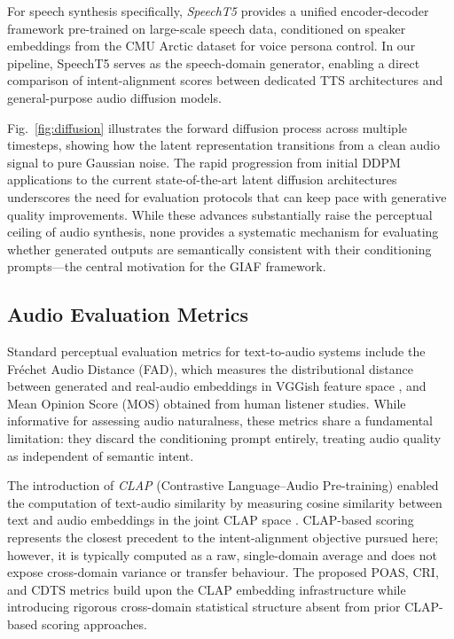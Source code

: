 \documentclass[journal]{IEEEtran}
\begin{document}
For speech synthesis specifically, \textit{SpeechT5}
\cite{ao2021speecht5} provides a unified encoder-decoder framework
pre-trained on large-scale speech data, conditioned on speaker
embeddings from the CMU Arctic dataset for voice persona control.
In our pipeline, SpeechT5 serves as the speech-domain generator,
enabling a direct comparison of intent-alignment scores between
dedicated TTS architectures and general-purpose audio diffusion models.



Fig.~\ref{fig:diffusion} illustrates the forward diffusion process
across multiple timesteps, showing how the latent representation
transitions from a clean audio signal to pure Gaussian noise. The
rapid progression from initial DDPM applications to the current state-of-the-art
latent diffusion architectures underscores the need for evaluation
protocols that can keep pace with generative quality improvements.
While these advances substantially raise the perceptual ceiling of
audio synthesis, none provides a systematic mechanism for evaluating
whether generated outputs are semantically consistent with their
conditioning prompts---the central motivation for the GIAF framework.

\subsection{Audio Evaluation Metrics}

Standard perceptual evaluation metrics for text-to-audio systems
include the Fr{\'e}chet Audio Distance (FAD), which measures the
distributional distance between generated and real-audio embeddings
in VGGish feature space \cite{kilgour2018fad}, and Mean Opinion Score
(MOS) obtained from human listener studies. While informative for
assessing audio naturalness, these metrics share a fundamental
limitation: they discard the conditioning prompt entirely, treating
audio quality as independent of semantic intent.

The introduction of \textit{CLAP} (Contrastive Language--Audio
Pre-training) \cite{elizalde2023clap} enabled the computation of
text-audio similarity by measuring cosine similarity between text and
audio embeddings in the joint CLAP space \cite{wu2023largescale}.
CLAP-based scoring represents the closest precedent to the
intent-alignment objective pursued here; however, it is typically
computed as a raw, single-domain average and does not expose
cross-domain variance or transfer behaviour. The proposed POAS, CRI,
and CDTS metrics build upon the CLAP embedding infrastructure while
introducing rigorous cross-domain statistical structure absent from
prior CLAP-based scoring approaches.
\end{document}
